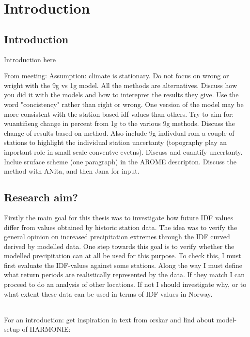 \section{Introduction}
\label{sec:introduction}
\subsection{Introduction}
Introduction here 

From meeting:
Assumption: climate is stationary.
Do not focus on wrong or wright with the 9g vs 1g model. All the methods are alternatives. Discuss how you did it with the models and how to interepret the results they give. Use the word "concistency" rather than right or wrong. One version of the model may be more consistent with the station based idf values than others.
Try to aim for: wuantifieng change in percent from 1g to the various 9g methods. Discuss the change of results based on method.
Also include 9g indivdual rom a couple of stations to highlight the individual station uncertanty (topography play an inportant role in small scale conventve evetns). Discuss and cuantify uncertanty. 
Inclue sruface scheme (one paragraph) in the AROME descripton.
Discuss the method with ANita, and then Jana for input. 

\subsection{Research aim?}
Firstly the main goal for this thesis was to investigate how future IDF values differ from values obtained by historic station data. The idea was to verify the general opinion on increased precipitation extremes through the IDF curved derived by modelled data. One step towards this goal is to verify whether the modelled precipitation can at all be used for this purpose. To check this, I must first evaluate the IDF-values against some stations. Along the way I must define what return periods are realistically represented by the data. If they match I can proceed to do an analysis of other locations. If not I should investigate why, or to what extent these data can be used in terms of IDF values in Norway.

\\
For an introduction: get inspiration in text from orskar and lind about model-setup of HARMONIE: \cite{lind_arome} 